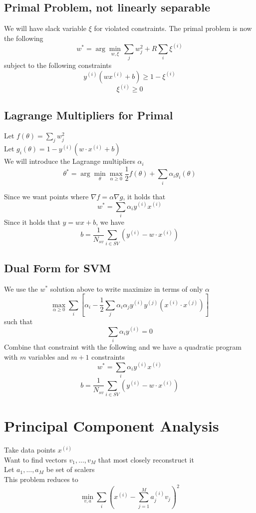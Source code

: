 \documentclass[twoside,11pt]{article}
\theoremstyle{definition}
\begin{document}
\subsection{Primal Problem, not linearly separable}

We will have slack variable $\xi$ for violated constraints. The primal problem is now the following
\[
w^{*} = \arg \min_{w,\xi} \sum_j w_j^2 + R \sum_i \xi^{(i)}
\]
subject to the following constraints
\[
y^{(i)} (w x^{(i)} + b) \geq 1 - \xi^{(i)}
\]
\[
\xi^{(i)} \geq 0
\]

\subsection{Lagrange Multipliers for Primal}

Let $f(\theta) = \sum_j {w_j^2}$\\
Let $g_i(\theta) = 1-y^{(i)}(w \cdot x^{(i)} + b)$\\
We will introduce the Lagrange multipliers $\alpha_i$\\
\[
\theta^* = \arg \min_{\theta} \max_{\alpha \geq 0} \frac{1}{2} f(\theta) + \sum_i \alpha_i g_i(\theta)
\]

Since we want points where $\nabla f = \alpha \nabla g$, it holds that 
\[
w^* = \sum_i \alpha_i y^{(i)} x^{(i)}
\]
Since it holds that $y=wx+b$, we have
\[
b = \frac{1}{N_{sv}} \sum_{i \in SV} (y^{(i)} - w \cdot x^{(i)})
\]

\subsection{Dual Form for SVM}

We use the $w^*$ solution above to write maximize in terms of only $\alpha$ 
\[
\max_{\alpha \geq 0} \sum_i [\alpha_i - \frac{1}{2} \sum_j \alpha_i \alpha_j y^{(i)} y^{(j)} (x^{(i)} \cdot x^{(j)})]
\]
such that
\[
\sum_i \alpha_i y^{(i)} = 0
\]
Combine that constraint with the following and we have a quadratic program with $m$ variables and $m+1$ constraints 
\[
w^* = \sum_i \alpha_i y^{(i)} x^{(i)}
\]
\[
b = \frac{1}{N_{sv}} \sum_{i \in SV} (y^{(i)} - w \cdot x^{(i)})
\]

\newpage

\section{Principal Component Analysis}

Take data points $x^{(i)}$\\
Want to find vectors $v_1,...,v_M$ that most closely reconstruct it\\
Let $a_1,...,a_M$ be set of scalers\\
This problem reduces to
\[
\min_{v,a} \sum_{i} (x^{(i)} - \sum_{j=1}^M a_j^{(i)}v_j)^2
\]
\end{document}

